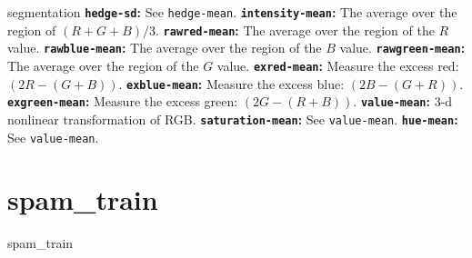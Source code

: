 \begin{datasetDescription}{segmentation}
{        \textbf{\texttt{hedge-sd}:} See \texttt{hedge-mean}.\newline
        \textbf{\texttt{intensity-mean}:} The average over the region of
            \ensuremath{\left(R+G+B\right)/3}.\newline
        \textbf{\texttt{rawred-mean}:} The average over the region of the
            \ensuremath{R} value.\newline
        \textbf{\texttt{rawblue-mean}:} The average over the region of the
            \ensuremath{B} value.\newline
        \textbf{\texttt{rawgreen-mean}:} The average over the region of the
            \ensuremath{G} value.\newline
        \textbf{\texttt{exred-mean}:} Measure the excess red:
            \ensuremath{\left(2R-\left(G+B\right)\right)}.\newline
        \textbf{\texttt{exblue-mean}:} Measure the excess blue:
            \ensuremath{\left(2B-\left(G+R\right)\right)}.\newline
        \textbf{\texttt{exgreen-mean}:} Measure the excess green:
            \ensuremath{\left(2G-\left(R+B\right)\right)}.\newline
        \textbf{\texttt{value-mean}:} 3-d nonlinear transformation of RGB.
            \newline
        \textbf{\texttt{saturation-mean}:} See \texttt{value-mean}.\newline
        \textbf{\texttt{hue-mean}:} See \texttt{value-mean}.
    }
\end{datasetDescription}

\section{spam\_train}
\label{sec:datasets:spam_train}
\begin{datasetDescription}{spam_train}
\end{datasetDescription}

